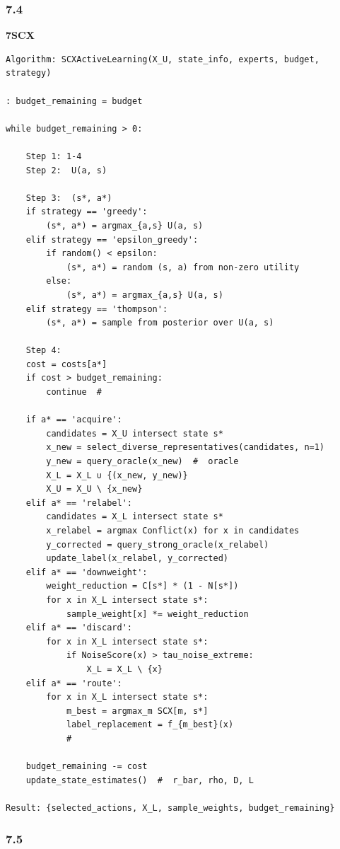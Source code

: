 \documentclass[
  12pt,
]{article}
\begin{document}
\subsubsection{7.4 }\label{ux5b9eux73b0ux65b9ux6cd5-6}

\textbf{ 7SCX }

\begin{verbatim}
Algorithm: SCXActiveLearning(X_U, state_info, experts, budget, strategy)

: budget_remaining = budget

while budget_remaining > 0:

    Step 1: 1-4
    Step 2:  U(a, s)

    Step 3:  (s*, a*)
    if strategy == 'greedy':
        (s*, a*) = argmax_{a,s} U(a, s)
    elif strategy == 'epsilon_greedy':
        if random() < epsilon:
            (s*, a*) = random (s, a) from non-zero utility
        else:
            (s*, a*) = argmax_{a,s} U(a, s)
    elif strategy == 'thompson':
        (s*, a*) = sample from posterior over U(a, s)

    Step 4: 
    cost = costs[a*]
    if cost > budget_remaining:
        continue  # 

    if a* == 'acquire':
        candidates = X_U intersect state s*
        x_new = select_diverse_representatives(candidates, n=1)
        y_new = query_oracle(x_new)  #  oracle
        X_L = X_L ∪ {(x_new, y_new)}
        X_U = X_U \ {x_new}
    elif a* == 'relabel':
        candidates = X_L intersect state s*
        x_relabel = argmax Conflict(x) for x in candidates
        y_corrected = query_strong_oracle(x_relabel)
        update_label(x_relabel, y_corrected)
    elif a* == 'downweight':
        weight_reduction = C[s*] * (1 - N[s*])
        for x in X_L intersect state s*:
            sample_weight[x] *= weight_reduction
    elif a* == 'discard':
        for x in X_L intersect state s*:
            if NoiseScore(x) > tau_noise_extreme:
                X_L = X_L \ {x}
    elif a* == 'route':
        for x in X_L intersect state s*:
            m_best = argmax_m SCX[m, s*]
            label_replacement = f_{m_best}(x)
            # 

    budget_remaining -= cost
    update_state_estimates()  #  r_bar, rho, D, L 

Result: {selected_actions, X_L, sample_weights, budget_remaining}
\end{verbatim}

\subsubsection{7.5
}\label{ux4e3bux52a8ux5b66ux4e60ux7684ux505cux6b62ux6761ux4ef6}
\end{document}
